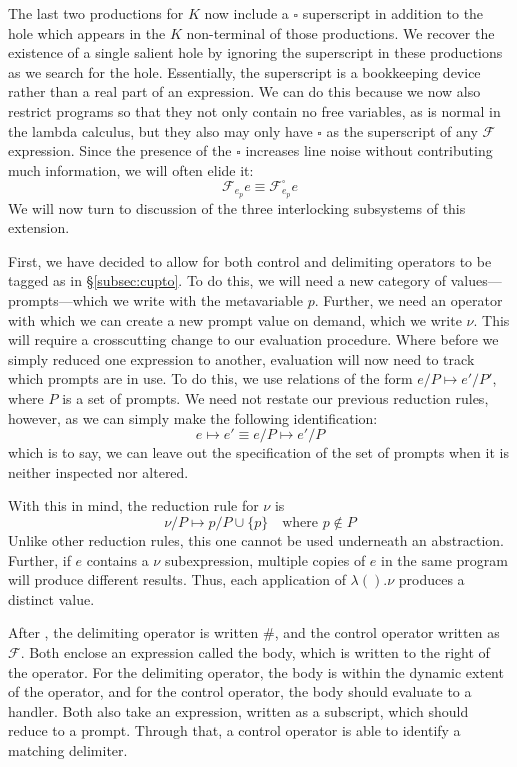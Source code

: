 \documentclass[11pt]{article}
\newcommand\F{\mathcal{F}}
\begin{document}
The last two productions for $K$ now include a $\square$ superscript in addition to the hole which appears in the $K$ non-terminal of those productions.
We recover the existence of a single salient hole by ignoring the superscript in these productions as we search for the hole.
Essentially, the superscript is a bookkeeping device rather than a real part of an expression.
We can do this because we now also restrict programs so that they not only contain no free variables, as is normal in the lambda calculus, but they also may only have $\square$ as the superscript of any $\F$ expression.
Since the presence of the $\square$ increases line noise without contributing much information, we will often elide it:
$$\F_{e_p}e \equiv \F_{e_p}^{\square}e$$
We will now turn to discussion of the three interlocking subsystems of this extension.

First, we have decided to allow for both control and delimiting operators to be tagged as in \S\ref{subsec:cupto}.
To do this, we will need a new category of values---prompts---which we write with the metavariable $p$.
Further, we need an operator with which we can create a new prompt value on demand, which we write $\nu$.
This will require a crosscutting change to our evaluation procedure.
Where before we simply reduced one expression to another, evaluation will now need to track which prompts are in use.
To do this, we use relations of the form $e/P \mapsto e'/P'$, where $P$ is a set of prompts.
We need not restate our previous reduction rules, however, as we can simply make the following identification:
$$e \mapsto e' \equiv e/P \mapsto e'/P$$
which is to say, we can leave out the specification of the set of prompts when it is neither inspected nor altered.

With this in mind, the reduction rule for $\nu$ is
$$\nu/P \mapsto p/P\cup\{p\} \quad\textrm{where }p \notin P$$
Unlike other reduction rules, this one cannot be used underneath an abstraction.
Further, if $e$ contains a $\nu$ subexpression, multiple copies of $e$ in the same program will produce different results.
Thus, each application of $\lambda().\nu$ produces a distinct value.


After \cite{PromptApplication}, the delimiting operator is written $\#$, and the control operator written as $\F$.
Both enclose an expression called the body, which is written to the right of the operator.
For the delimiting operator, the body is within the dynamic extent of the operator, and for the control operator, the body should evaluate to a handler.
Both also take an expression, written as a subscript, which should reduce to a prompt. Through that, a control operator is able to identify a matching delimiter.
\end{document}
